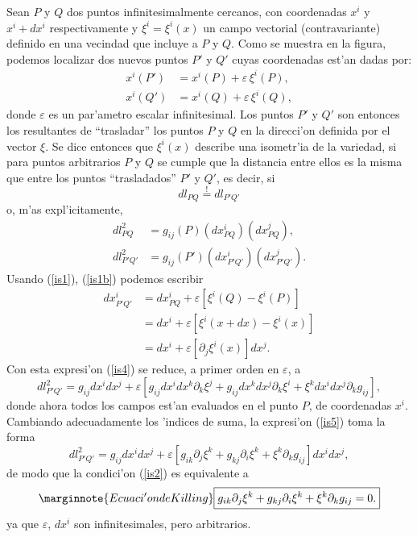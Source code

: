 Sean $P$ y $Q$ dos puntos infinitesimalmente cercanos, con coordenadas $x^i$ y $x^i+dx^i$ respectivamente y $\xi^i=\xi^i(x)$ un campo vectorial (contravariante) definido en una vecindad que incluye a $P$ y $Q$. Como se muestra en la figura, podemos localizar dos nuevos puntos $P'$ y $Q'$ cuyas coordenadas est'an dadas por:%
\begin{align}
x^i(P')  & = x^i(P)+\varepsilon\,\xi^i(P)\label{is1},\\
x^i(Q')  & = x^i(Q)+\varepsilon\,\xi^i(Q), \label{is1b}
\end{align}
donde $\varepsilon$ es un par'ametro escalar infinitesimal. Los puntos $P'$ y $Q'$ son entonces los resultantes de ``trasladar'' los puntos $P$ y $Q$ en la direcci'on definida por el vector $\xi$. Se dice entonces que $\xi^i(x)$ describe una isometr'ia de la variedad, si para puntos arbitrarios $P$ y $Q$ se cumple que la distancia entre ellos es la misma que entre los puntos ``trasladados'' $P'$ y $Q'$, es decir, si
\begin{equation}
dl_{PQ}\stackrel{!}{=}dl_{P'Q'}  \label{is2}%
\end{equation}
o, m'as expl'icitamente,
\begin{align}
dl_{PQ}^2  &  =g_{ij}(P)(dx^i_{PQ})(dx^j_{PQ}) , \label{is3}\\
dl_{P'Q'}^2  &  =g_{ij}(P')(dx^i_{P'Q'})(dx^j_{P'Q'}) . \label{is4}
\end{align}
Usando (\ref{is1}), (\ref{is1b}) podemos escribir
\begin{align}
dx^i_{P'Q'} &= dx^i_{PQ}+\varepsilon\left[\xi^i(Q)-\xi^i(P)\right] \\
&= dx^i+\varepsilon\left[\xi^i(x+dx)-\xi^i(x)\right] \\
&= dx^i+\varepsilon \left[\partial_j\xi^i(x)\right]dx^j.
\end{align}
Con esta expresi'on (\ref{is4}) se reduce, a primer orden en $\varepsilon$, a
\begin{equation}
dl_{P'Q'}^2=g_{ij}dx^idx^j+\varepsilon\left[g_{ij}dx^idx^k\partial_k\xi^j
+g_{ij}dx^kdx^j\partial_k\xi^i+\xi^kdx^idx^j\partial_kg_{ij}\right],  \label{is5}
\end{equation}
donde ahora todos los campos est'an evaluados en el punto $P$, de coordenadas $x^i$.
Cambiando adecuadamente los 'indices de suma, la expresi'on (\ref{is5}) toma la forma
\begin{equation}
dl_{P'Q'}^2=g_{ij}dx^idx^j+\varepsilon\left[g_{ik}\partial_j\xi^k
+g_{kj}\partial_i\xi^k+\xi^k\partial_kg_{ij}\right] dx^idx^j,
\label{is6}%
\end{equation}
de modo que la condici'on (\ref{is2}) es equivalente a
\begin{equation}\marginnote{Ecuaci'on de Killing}
\boxed{g_{ik}\partial_j\xi^k+g_{kj}\partial_i\xi^k+\xi^k\partial_kg_{ij}=0.} \label{is8}
\end{equation}
ya que $\varepsilon$, $dx^i$ son infinitesimales, pero arbitrarios.

